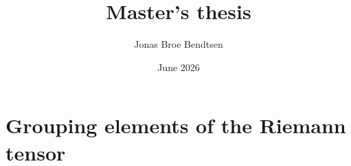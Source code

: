 \documentclass{article}
\title{Master's thesis}
\author{Jonas Broe Bendtsen}
\date{June 2026}
\begin{document}
\maketitle
\section{Grouping elements of the Riemann tensor}\label{sec:a}

\end{document}
